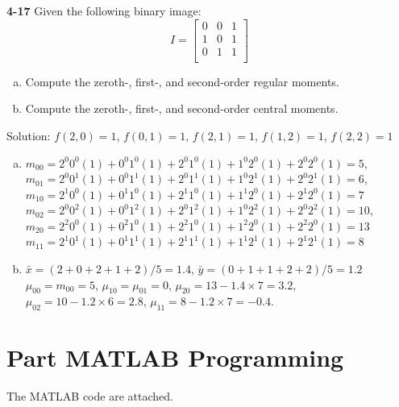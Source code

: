 \documentclass[a4paper]{article}
\begin{document}
\begin{spacing}{2.0}
	\noindent
	\textbf{4-17} Given the following binary image:
	$$I = \begin{bmatrix} 0 & 0 & 1\\ 1 & 0 & 1\\0 & 1 & 1\\\end{bmatrix}$$
	\begin{enumerate}[(a)]
	\item Compute the zeroth-, first-, and second-order regular moments. 
	\item Compute the zeroth-, first-, and second-order central moments. 
	\end{enumerate}
	Solution: $f(2,0) = 1$, $f(0,1) = 1$, $f(2,1) = 1$, $f(1,2) = 1$, $f(2,2) = 1$
	\begin{enumerate}[(a)]
	\item $m_{00} = 2^{0}0^{0}(1) + 0^{0}1^{0}(1) + 2^{0}1^{0}(1) + 1^{0}2^{0}(1) + 2^{0}2^{0}(1) = 5$,\\
	$m_{01} =  2^{0}0^{1}(1) + 0^{0}1^{1}(1) + 2^{0}1^{1}(1) + 1^{0}2^{1}(1) + 2^{0}2^{1}(1) = 6$, $m_{10} = 2^{1}0^{0}(1) + 0^{1}1^{0}(1) + 2^{1}1^{0}(1) + 1^{1}2^{0}(1) + 2^{1}2^{0}(1) = 7$\\
	$m_{02} = 2^{0}0^{2}(1) + 0^{0}1^{2}(1) + 2^{0}1^{2}(1) + 1^{0}2^{2}(1) + 2^{0}2^{2}(1) = 10$, $m_{20} = 2^{2}0^{0}(1) + 0^{2}1^{0}(1) + 2^{2}1^{0}(1) + 1^{2}2^{0}(1) + 2^{2}2^{0}(1) = 13$\\
	$m_{11} =  2^{1}0^{1}(1) + 0^{1}1^{1}(1) + 2^{1}1^{1}(1) + 1^{1}2^{1}(1) + 2^{1}2^{1}(1) = 8$
	\item $\bar x = (2+0+2+1+2)/5 = 1.4$, $\bar y = (0+1+1+2+2)/5 = 1.2$\\
	$\mu_{00} = m_{00} = 5$, $\mu_{10} = \mu_{01}  = 0$, $\mu_{20} = 13 - 1.4\times 7 = 3.2$, $\mu_{02} = 10 - 1.2\times 6 = 2.8$, $\mu_{11} = 8 - 1.2\times 7 = -0.4$.
	\end{enumerate}
		
	

\newpage	
\section*{\huge\textbf{ Part \uppercase\expandafter{} MATLAB Programming} }
	\normalsize
	The MATLAB code are attached.
		

	
\end{spacing}
\end{document}
